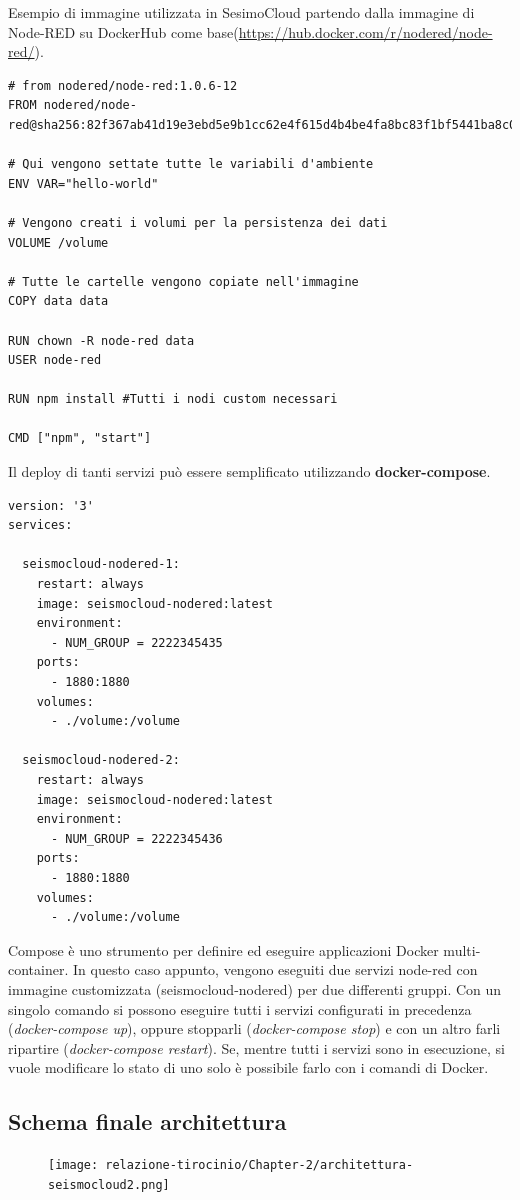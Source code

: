\documentclass[a4paper,10pt]{memoir}
\begin{document}
Esempio di immagine utilizzata in SesimoCloud partendo dalla immagine di Node-RED su DockerHub come base(\href{https://hub.docker.com/r/nodered/node-red/}{https://hub.docker.com/r/nodered/node-red/}).
\begin{lstlisting}[language=docker]
# from nodered/node-red:1.0.6-12
FROM nodered/node-red@sha256:82f367ab41d19e3ebd5e9b1cc62e4f615d4b4be4fa8bc83f1bf5441ba8c0d32a

# Qui vengono settate tutte le variabili d'ambiente
ENV VAR="hello-world"

# Vengono creati i volumi per la persistenza dei dati
VOLUME /volume

# Tutte le cartelle vengono copiate nell'immagine
COPY data data

RUN chown -R node-red data
USER node-red

RUN npm install #Tutti i nodi custom necessari

CMD ["npm", "start"]
\end{lstlisting}
Il deploy di tanti servizi può essere semplificato utilizzando \textbf{docker-compose}.
\begin{lstlisting}[language=docker-compose-2]
version: '3'
services:

  seismocloud-nodered-1:
    restart: always
    image: seismocloud-nodered:latest
    environment:
      - NUM_GROUP = 2222345435
    ports:
      - 1880:1880
    volumes:
      - ./volume:/volume
      
  seismocloud-nodered-2:
    restart: always
    image: seismocloud-nodered:latest
    environment:
      - NUM_GROUP = 2222345436
    ports:
      - 1880:1880
    volumes:
      - ./volume:/volume
\end{lstlisting}
Compose è uno strumento per definire ed eseguire applicazioni Docker multi-container.
In questo caso appunto, vengono eseguiti due servizi node-red con immagine customizzata (seismocloud-nodered) per due differenti gruppi.
Con un singolo comando si possono eseguire tutti i servizi configurati in precedenza (\textit{docker-compose up}), oppure stopparli (\textit{docker-compose stop}) e con un altro farli ripartire (\textit{docker-compose restart}).
Se, mentre tutti i servizi sono in esecuzione, si vuole modificare lo stato di uno solo è possibile farlo con i comandi di Docker.
\clearpage

\subsection{Schema finale architettura}
\begin{figure}[H]
\texttt{[image: relazione-tirocinio/Chapter-2/architettura-seismocloud2.png]}
\end{figure}
\end{document}
